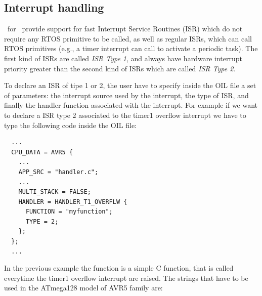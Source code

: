 
\subsection{Interrupt handling}
\ee\ for \avr\ provide support for fast Interrupt Service
Routines (ISR) which do not require any RTOS primitive to be called,
as well as regular ISRs, which can call RTOS primitives (e.g., a timer
interrupt can call  to activate a periodic task). The
first kind of ISRs are called {\em ISR Type 1}, and always have
hardware interrupt priority greater than the second kind of ISRs which
are called {\em ISR Type 2}.

To declare an ISR of tipe 1 or 2, the user have to specify inside the
OIL file a set of parameters: the interrupt source used by the
interrupt, the type of ISR, and finally the handler function
associated with the interrupt.  For example if we want to declare a
ISR type 2 associated to the timer1 overflow interrupt we have to type
the following code inside the OIL file:

\begin{lstlisting}
  ...
  CPU_DATA = AVR5 {
    ...
    APP_SRC = "handler.c";
    ...
    MULTI_STACK = FALSE;
    HANDLER = HANDLER_T1_OVERFLW {	
      FUNCTION = "myfunction";
      TYPE = 2;
    };
  };
  ...
\end{lstlisting}

In the previous example the function  is a simple
C function, that is called everytime the timer1 overflow interrupt are
raised.  The strings that have to be used in the ATmega128 model of
AVR5 family are:

